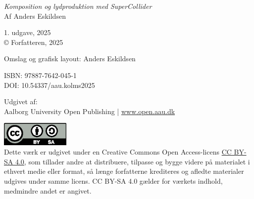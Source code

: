\thispagestyle{empty}

\vspace{4em}
\emph{Komposition og lydproduktion med SuperCollider} \\
Af Anders Eskildsen

1. udgave, 2025 \\
\copyright{} Forfatteren, 2025

Omslag og grafisk layout: Anders Eskildsen

ISBN: 97887-7642-045-1 \\
DOI: 10.54337/aau.kolms2025

Udgivet af: \\
Aalborg University Open Publishing | \href{https://www.open.aau.dk}{www.open.aau.dk}

\vspace{1em}
\href{https://creativecommons.org/licenses/by-sa/4.0/}{\includegraphics[width=0.25\textwidth]{book_media/cc-by-sa.eps}} \\
Dette værk er udgivet under en Creative Commons Open Access-licens \href{https://creativecommons.org/licenses/by-sa/4.0/}{CC BY-SA 4.0}, som tillader andre at distribuere, tilpasse og bygge videre på materialet i ethvert medie eller format, så længe forfatterne krediteres og afledte materialer udgives under samme licens. CC BY-SA 4.0 gælder for værkets indhold, medmindre andet er angivet.
